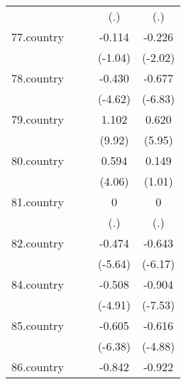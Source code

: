 {\begin{tabular}{l*{4}{c}}
            &                     &                     &         (.)         &         (.)         \\
[1em]
77.country  &                     &                     &      -0.114         &      -0.226\sym{*}  \\
            &                     &                     &     (-1.04)         &     (-2.02)         \\
[1em]
78.country  &                     &                     &      -0.430\sym{***}&      -0.677\sym{***}\\
            &                     &                     &     (-4.62)         &     (-6.83)         \\
[1em]
79.country  &                     &                     &       1.102\sym{***}&       0.620\sym{***}\\
            &                     &                     &      (9.92)         &      (5.95)         \\
[1em]
80.country  &                     &                     &       0.594\sym{***}&       0.149         \\
            &                     &                     &      (4.06)         &      (1.01)         \\
[1em]
81.country  &                     &                     &           0         &           0         \\
            &                     &                     &         (.)         &         (.)         \\
[1em]
82.country  &                     &                     &      -0.474\sym{***}&      -0.643\sym{***}\\
            &                     &                     &     (-5.64)         &     (-6.17)         \\
[1em]
84.country  &                     &                     &      -0.508\sym{***}&      -0.904\sym{***}\\
            &                     &                     &     (-4.91)         &     (-7.53)         \\
[1em]
85.country  &                     &                     &      -0.605\sym{***}&      -0.616\sym{***}\\
            &                     &                     &     (-6.38)         &     (-4.88)         \\
[1em]
86.country  &                     &                     &      -0.842\sym{***}&      -0.922\sym{***}\\

\end{tabular}}
